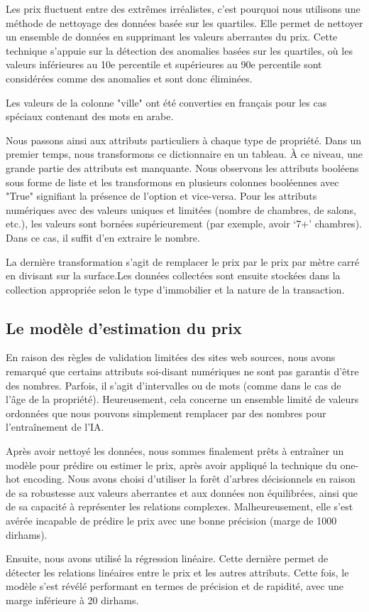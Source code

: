\documentclass[a4paper,12pt]{report}
\numberwithin{equation}{section}
\begin{document}
Les prix fluctuent entre des extrêmes irréalistes, c’est pourquoi nous utilisons une méthode de nettoyage des données basée sur les quartiles. Elle permet de nettoyer un ensemble de données en supprimant les valeurs aberrantes du prix. Cette technique s'appuie sur la détection des anomalies basées sur les quartiles, où les valeurs inférieures au 10e percentile et supérieures au 90e percentile sont considérées comme des anomalies et sont donc éliminées.
\par
Les valeurs de la colonne "ville" ont été converties en français pour les cas spéciaux contenant des mots en arabe.
\\ \par
Nous passons ainsi aux attributs particuliers à chaque type de propriété. Dans un premier temps, nous transformons ce dictionnaire en un tableau. À ce niveau, une grande partie des attributs est manquante. Nous observons les attributs booléens sous forme de liste et les transformons en plusieurs colonnes booléennes avec "True" signifiant la présence de l’option et vice-versa. Pour les attributs numériques avec des valeurs uniques et limitées (nombre de chambres, de salons, etc.), les valeurs sont bornées supérieurement (par exemple, avoir ‘7+’ chambres). Dans ce cas, il suffit d'en extraire le nombre.
\\ \par
La dernière transformation s’agit de remplacer le prix par le prix par mètre carré en divisant sur la surface.Les données collectées sont ensuite stockées dans la collection appropriée selon le type d’immobilier et la nature de la transaction.
\subsection{Le modèle d’estimation du prix}
\par 
En raison des règles de validation limitées des sites web sources, nous avons remarqué que certains attributs soi-disant numériques ne sont pas garantis d'être des nombres. Parfois, il s'agit d'intervalles ou de mots (comme dans le cas de l'âge de la propriété). Heureusement, cela concerne un ensemble limité de valeurs ordonnées que nous pouvons simplement remplacer par des nombres pour l'entraînement de l’IA.
\\ \par
Après avoir nettoyé les données, nous sommes finalement prêts à entraîner un modèle pour prédire ou estimer le prix, après avoir appliqué la technique du one-hot encoding. Nous avons choisi d’utiliser la forêt d'arbres décisionnels en raison de sa robustesse aux valeurs aberrantes et aux données non équilibrées, ainsi que de sa capacité à représenter les relations complexes. Malheureusement, elle s'est avérée incapable de prédire le prix avec une bonne précision (marge de 1000 dirhams).
\\ \par
Ensuite, nous avons utilisé la régression linéaire. Cette dernière permet de détecter les relations linéaires entre le prix et les autres attributs. Cette fois, le modèle s'est révélé performant en termes de précision et de rapidité, avec une marge inférieure à 20 dirhams.
\newpage
\end{document}
